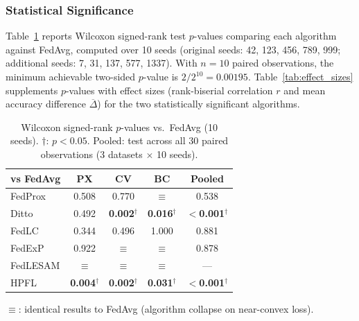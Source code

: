 \documentclass[conference]{IEEEtran}
\begin{document}
\subsubsection{Statistical Significance}

Table~\ref{tab:significance} reports Wilcoxon signed-rank test $p$-values comparing each algorithm against FedAvg, computed over 10 seeds (original seeds: 42, 123, 456, 789, 999; additional seeds: 7, 31, 137, 577, 1337). With $n{=}10$ paired observations, the minimum achievable two-sided $p$-value is $2/2^{10} = 0.00195$. Table~\ref{tab:effect_sizes} supplements $p$-values with effect sizes (rank-biserial correlation $r$ and mean accuracy difference $\overline{\Delta}$) for the two statistically significant algorithms.

\begin{table}[t]
\centering
\caption{Wilcoxon signed-rank $p$-values vs.\ FedAvg (10 seeds). $\dagger$: $p < 0.05$. Pooled: test across all 30 paired observations (3 datasets $\times$ 10 seeds).}
\label{tab:significance}
\small
\begin{tabular}{lcccc}
\toprule
\textbf{vs FedAvg} & \textbf{PX} & \textbf{CV} & \textbf{BC} & \textbf{Pooled} \\
\midrule
FedProx & 0.508 & 0.770 & $\equiv$ & 0.538 \\
Ditto & 0.492 & \textbf{0.002}$^\dagger$ & \textbf{0.016}$^\dagger$ & \textbf{$<$0.001}$^\dagger$ \\
FedLC & 0.344 & 0.496 & 1.000 & 0.881 \\
FedExP & 0.922 & $\equiv$ & $\equiv$ & 0.878 \\
FedLESAM & $\equiv$ & $\equiv$ & $\equiv$ & --- \\
HPFL & \textbf{0.004}$^\dagger$ & \textbf{0.002}$^\dagger$ & \textbf{0.031}$^\dagger$ & \textbf{$<$0.001}$^\dagger$ \\
\bottomrule
\end{tabular}

\vspace{1mm}
\footnotesize{$\equiv$: identical results to FedAvg (algorithm collapse on near-convex loss).}
\end{table}
\end{document}
